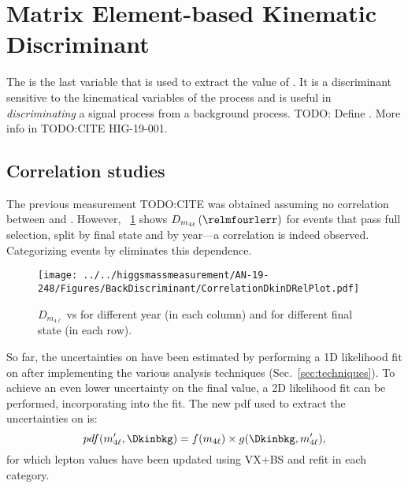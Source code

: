 \section{Matrix Element-based Kinematic Discriminant}
\label{sec:Dkin}
The \Dkinbkg is the last variable that is used to extract the value of \mH.
It is a discriminant sensitive to the kinematical variables of the \qqggzzfourl process and is useful in \emph{discriminating} a signal process from a background process.
TODO: Define \Dkinbkg.
More info in TODO:CITE HIG-19-001.


\subsection{Correlation studies}
\label{sec:DkinCorrelation}
The previous \mH measurement TODO:CITE was obtained assuming no correlation between \relmfourlerrflat and \Dkinbkg.
However, \figurename~\ref{Dkin_sigma_correlation} shows $D_{m_{4\ell}} \left( \relmfourlerr \right)$ \vs \Dkinbkg for events that pass full selection, split by final state and by year---a correlation is indeed observed.
Categorizing events by \relmfourlerrflat eliminates this dependence.
\begin{figure}[!htbp]
\begin{center}
	\texttt{[image: ../../higgsmassmeasurement/AN-19-248/Figures/BackDiscriminant/CorrelationDkinDRelPlot.pdf]}
\caption{$D_{m_{4\ell}}$ vs \Dkinbkg for different year (in each column) and for different final state (in each row).}
\label{Dkin_sigma_correlation}
\end{center}
\end{figure}

So far, the uncertainties on \mH have been estimated by performing a 1D likelihood fit on \mfourl after implementing the various analysis techniques (Sec.~\ref{sec:techniques}).
To achieve an even lower uncertainty on the final \mH value, a 2D likelihood fit can be performed, incorporating \Dkinbkg into the fit.
The new pdf used to extract the uncertainties on \mH is:
\[
pdf(m'_{4\ell}, \Dkinbkg) = f(m_{4\ell}) \times g(\Dkinbkg, m'_{4\ell}),
\]
for which lepton \pt values have been updated using VX+BS and \Zone refit in each category.

